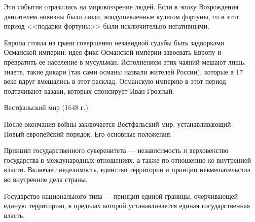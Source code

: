 
Эти события отразились на мировоззрение людей. Если в эпоху Возрождения двигателем новизны были люди, воодушевленные культом фортуны, то в этот период <<подарки фортуны>> были исключительно негативными.



Европа стояла на грани совершенно незавидной судьбы быть задворками Османской
империи: идея фикс Османской империи завоевать Европу и превратить ее
население в мусульман. Исполнением этих чаяний мешают лишь, знаете, такие дикари (так сами османы назвали жителей России), которые в 17 веке вдруг вмешались в этот расклад. Османскую империю в этот период подтачивают казаки, которых спонсирует Иван Грозный. 

Вестфальский мир (1648 г.)

После окончания войны заключается Вестфальский мир, устанавливающий Новый европейский порядок. Его основные положения:

Принцип государственного суверенитета --- независимость и верховенство государства в международных отношениях, а также по отношению
ко внутренней власти. Включает неделимость, единство территории и принцип невмешательства во внутренние дела страны. 


Государство национального типа --- принцип единой границы, очерчивающей единую территорию, в пределах которой устанавливается единая государственная власть. 

